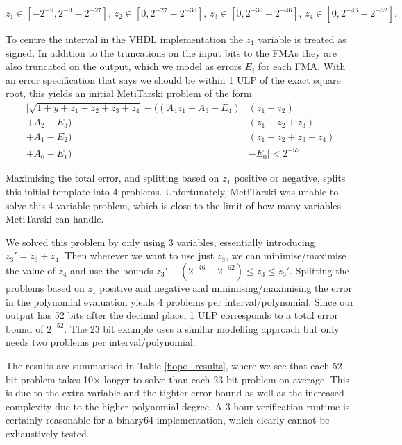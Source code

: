 \documentclass{fac}
\begin{document}
\begin{equation*}
    z_1 \in [-2^{-9}, 2^{-9}-2^{-27}], \,
    z_2 \in [0, 2^{-27} - 2^{-36}],\,
    z_3 \in [0, 2^{-36} - 2^{-46}],\,
    z_4 \in [0, 2^{-46} - 2^{-52}].
\end{equation*}

To centre the interval in the VHDL implementation the $z_1$ variable is treated as signed. In addition to the truncations on the input bits to the FMAs they are also truncated on the output, which we model as errors $E_i$ for each FMA\@. With an error specification that says we should be within 1 ULP of the exact square root, this yields an initial MetiTarski problem of the form
\begin{align*}
    |\sqrt{1+y+z_1+z_2+z_3+z_4} - ((A_4  z_1 + A_3 - E_4) & (z_1+z_2)\\
                                  + A_2 - E_3) & (z_1+z_2+z_3)\\
                                  + A_1 - E_2) & (z_1+z_2+z_3+z_4)\\
                                  + A_0 - E_1) &- E_0 | < 2^{-52}
\end{align*}

Maximising the total error, and splitting based on $z_1$ positive or negative, splits this initial template into 4 problems.
Unfortunately, MetiTarski was unable to solve this 4 variable problem, which is close to the limit of how many variables MetiTarski can handle. 

We solved this problem by only using 3 variables, essentially introducing $z_3' = z_3+z_4$. Then wherever we want to use just $z_3$, we can minimise/maximise the value of $z_4$ and use the bounds $z_3' - (2^{-46} - 2^{-52}) \leq z_3 \leq z_3'$. Splitting the problems based on $z_1$ positive and negative and minimising/maximising the error in the polynomial evaluation yields 4 problems per interval/polynomial. Since our output has 52 bits after the decimal place, 1 ULP corresponds to a total error bound of $2^{-52}$. The 23 bit example uses a similar modelling approach but only needs two problems per interval/polynomial. 

The results are summarised in Table \ref{flopo_results}, where we see that each 52 bit problem takes 10$\times$ longer to solve than each 23 bit problem on average. This is due to the extra variable and the tighter error bound as well as the increased complexity due to the higher polynomial degree. A 3 hour verification runtime is certainly reasonable for a binary64 implementation, which clearly cannot be exhaustively tested.
\end{document}
